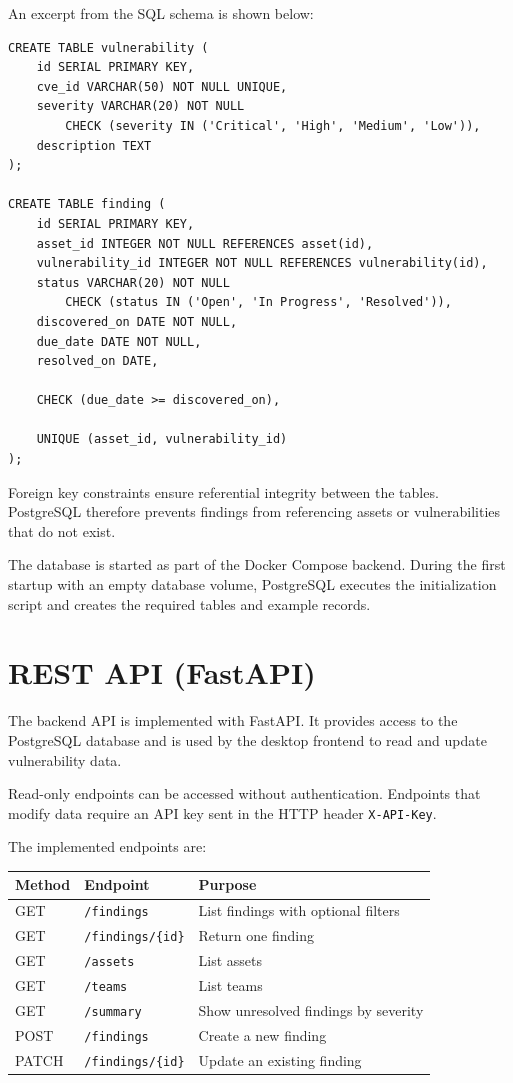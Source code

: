 \documentclass[11pt,a4paper]{article}
\begin{document}
An excerpt from the SQL schema is shown below:

\begin{verbatim}
CREATE TABLE vulnerability (
    id SERIAL PRIMARY KEY,
    cve_id VARCHAR(50) NOT NULL UNIQUE,
    severity VARCHAR(20) NOT NULL
        CHECK (severity IN ('Critical', 'High', 'Medium', 'Low')),
    description TEXT
);

CREATE TABLE finding (
    id SERIAL PRIMARY KEY,
    asset_id INTEGER NOT NULL REFERENCES asset(id),
    vulnerability_id INTEGER NOT NULL REFERENCES vulnerability(id),
    status VARCHAR(20) NOT NULL
        CHECK (status IN ('Open', 'In Progress', 'Resolved')),
    discovered_on DATE NOT NULL,
    due_date DATE NOT NULL,
    resolved_on DATE,

    CHECK (due_date >= discovered_on),

    UNIQUE (asset_id, vulnerability_id)
);
\end{verbatim}

Foreign key constraints ensure referential integrity between the tables.
PostgreSQL therefore prevents findings from referencing assets or
vulnerabilities that do not exist.

The database is started as part of the Docker Compose backend. During the first
startup with an empty database volume, PostgreSQL executes the initialization
script and creates the required tables and example records.

\section{REST API (FastAPI)}

The backend API is implemented with FastAPI. It provides access to the
PostgreSQL database and is used by the desktop frontend to read and update
vulnerability data.

Read-only endpoints can be accessed without authentication. Endpoints that
modify data require an API key sent in the HTTP header
\texttt{X-API-Key}.

The implemented endpoints are:

\begin{center}
\begin{tabular}{|l|l|l|}
\hline
\textbf{Method} & \textbf{Endpoint} & \textbf{Purpose} \\
\hline
GET & \texttt{/findings} & List findings with optional filters \\
GET & \texttt{/findings/\{id\}} & Return one finding \\
GET & \texttt{/assets} & List assets \\
GET & \texttt{/teams} & List teams \\
GET & \texttt{/summary} & Show unresolved findings by severity \\
POST & \texttt{/findings} & Create a new finding \\
PATCH & \texttt{/findings/\{id\}} & Update an existing finding \\
\hline
\end{tabular}
\end{center}
\end{document}
